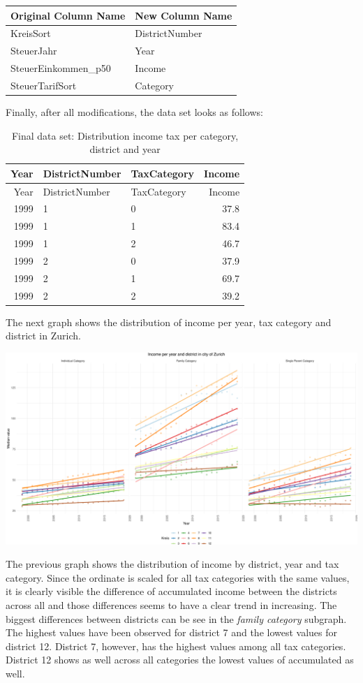 \documentclass[
]{article}
\begin{document}
\begin{longtable}[]{@{}ll@{}}
\toprule
Original Column Name & New Column Name\tabularnewline
\midrule
\endhead
KreisSort & DistrictNumber\tabularnewline
SteuerJahr & Year\tabularnewline
SteuerEinkommen\_p50 & Income\tabularnewline
SteuerTarifSort & Category\tabularnewline
\bottomrule
\end{longtable}

Finally, after all modifications, the data set looks as follows:

\begin{longtable}[]{@{}rllr@{}}
\caption{Final data set: Distribution income tax per category, district
and year}\tabularnewline
\toprule
Year & DistrictNumber & TaxCategory & Income\tabularnewline
\midrule
\endfirsthead
\toprule
Year & DistrictNumber & TaxCategory & Income\tabularnewline
\midrule
\endhead
1999 & 1 & 0 & 37.8\tabularnewline
1999 & 1 & 1 & 83.4\tabularnewline
1999 & 1 & 2 & 46.7\tabularnewline
1999 & 2 & 0 & 37.9\tabularnewline
1999 & 2 & 1 & 69.7\tabularnewline
1999 & 2 & 2 & 39.2\tabularnewline
\bottomrule
\end{longtable}

The next graph shows the distribution of income per year, tax category
and district in Zurich.

\includegraphics{report_files/figure-latex/plot_income-1.pdf}

The previous graph shows the distribution of income by district, year
and tax category. Since the ordinate is scaled for all tax categories
with the same values, it is clearly visible the difference of
accumulated income between the districts across all and those
differences seems to have a clear trend in increasing. The biggest
differences between districts can be see in the \emph{family category}
subgraph. The highest values have been observed for district 7 and the
lowest values for district 12. District 7, however, has the highest
values among all tax categories. District 12 shows as well across all
categories the lowest values of accumulated as well.
\end{document}
